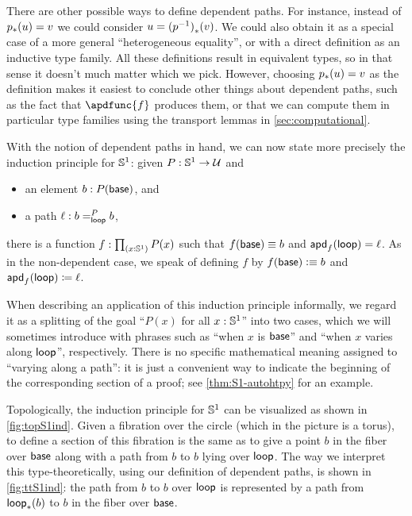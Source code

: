 \begin{rmk}
There are other possible ways to define dependent paths.
For instance, instead of $\trans p u = v$ we could consider $u = \trans{(\opp p)}{v}$.
We could also obtain it as a special case of a more general ``heterogeneous equality'',
%
%
or with a direct definition as an inductive type family.
All these definitions result in equivalent types, so in that sense it doesn't much matter which we pick.
However, choosing $\trans p u = v$ as the definition makes it easiest to conclude other things about dependent paths, such as the fact that $\apdfunc{f}$ produces them, or that we can compute them in particular type families using the transport lemmas in \cref{sec:computational}.
\end{rmk}

With the notion of dependent paths in hand, we can now state more precisely the induction principle for $\Sn^1$: given $P:\Sn^1\to\type$ and
\begin{itemize}
\item an element $b:P(\base)$, and
\item a path $\ell : \dpath P \lloop b b$,
\end{itemize}
there is a function $f:\prd{x:\Sn^1} P(x)$ such that $f(\base)\jdeq b$ and $\apd f \lloop = \ell$.
As in the non-dependent case, we speak of defining $f$ by $f(\base)\defeq b$ and $\apd f \lloop \defid \ell$.

\begin{rmk}\label{rmk:varies-along}
  When describing an application of this induction principle informally, we regard it as a splitting of the goal ``$P(x)$ for all $x:\Sn^1$'' into two cases, which we will sometimes introduce with phrases such as ``when $x$ is $\base$'' and ``when $x$ varies along $\lloop$'', respectively.
  There is no specific mathematical meaning assigned to ``varying along a path'': it is just a convenient way to indicate the beginning of the corresponding section of a proof; see \cref{thm:S1-autohtpy} for an example.
\end{rmk}

Topologically, the induction principle for $\Sn^1$ can be visualized as shown in \cref{fig:topS1ind}.
Given a fibration over the circle (which in the picture is a torus), to define a section of this fibration is the same as to give a point $b$ in the fiber over $\base$ along with a path from $b$ to $b$ lying over $\lloop$.
The way we interpret this type-theoretically, using our definition of dependent paths, is shown in \cref{fig:ttS1ind}: the path from $b$ to $b$ over $\lloop$ is represented by a path from $\trans \lloop b$ to $b$ in the fiber over $\base$.

